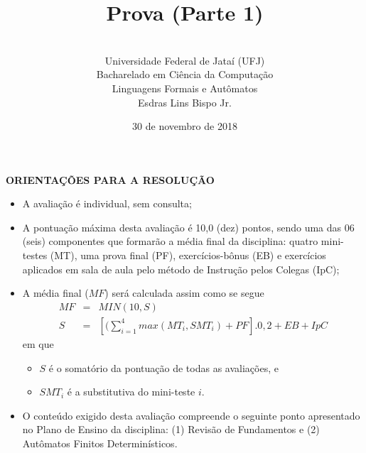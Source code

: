 \documentclass[12pt,a4paper,oneside]{article}
\author{\\Universidade Federal de Jataí (UFJ)\\Bacharelado em Ciência da Computação \\Linguagens Formais e Autômatos \\Esdras Lins Bispo Jr.}
\date{30 de novembro de 2018}
\title{\sc \huge Prova (Parte 1)}
\begin{document}
\maketitle

{\bf ORIENTAÇÕES PARA A RESOLUÇÃO}

\small
 
\begin{itemize}
	\item A avaliação é individual, sem consulta;
	\item A pontuação máxima desta avaliação é 10,0 (dez) pontos, sendo uma das 06 (seis) componentes que formarão a média final da disciplina: quatro mini-testes (MT), uma prova final (PF), exercícios-bônus (EB) e exercícios aplicados em sala de aula pelo método de Instrução pelos Colegas (IpC);
	\item A média final ($MF$) será calculada assim como se segue
	\begin{eqnarray}
		MF & = & MIN(10, S) \nonumber \\
		S & = & [(\sum_{i=1}^{4} max(MT_i, SMT_i ) + PF].0,2  + EB + IpC\nonumber
	\end{eqnarray}
	em que 
	\begin{itemize}
		\item $S$ é o somatório da pontuação de todas as avaliações, e
		\item $SMT_i$ é a substitutiva do mini-teste $i$.
	\end{itemize}
	\item O conteúdo exigido desta avaliação compreende o seguinte ponto apresentado no Plano de Ensino da disciplina: (1) Revisão de Fundamentos e (2) Autômatos Finitos Determinísticos.
\end{itemize}

\begin{center}
\end{center}

\newpage
\end{document}
